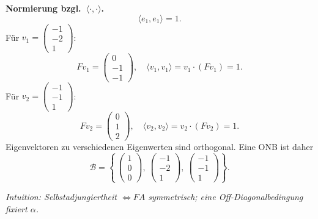 \documentclass[11pt, a4paper]{article}
\begin{document}
\begin{framed}
\medskip
\textbf{Normierung bzgl.\ $\langle\cdot,\cdot\rangle$.}
\[
\langle e_1,e_1\rangle=1.
\]
Für $v_1=\begin{pmatrix}-1\\-2\\1\end{pmatrix}$:
\[
Fv_1=\begin{pmatrix}0\\-1\\-1\end{pmatrix},\quad
\langle v_1,v_1\rangle=v_1\cdot(Fv_1)=1.
\]
Für $v_2=\begin{pmatrix}-1\\-1\\1\end{pmatrix}$:
\[
Fv_2=\begin{pmatrix}0\\1\\2\end{pmatrix},\quad
\langle v_2,v_2\rangle=v_2\cdot(Fv_2)=1.
\]
Eigenvektoren zu verschiedenen Eigenwerten sind orthogonal. Eine ONB ist daher
\[
\mathcal{B}=\left\{\,\begin{pmatrix}1\\0\\0\end{pmatrix},\
\begin{pmatrix}-1\\-2\\1\end{pmatrix},\
\begin{pmatrix}-1\\-1\\1\end{pmatrix}\right\}.
\]

\medskip\noindent\textit{Intuition: Selbstadjungiertheit $\Leftrightarrow FA$ symmetrisch; eine Off-Diagonalbedingung fixiert $\alpha$.}
\end{framed}
\end{document}
